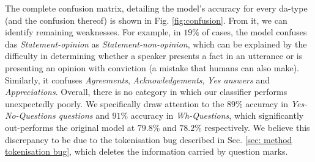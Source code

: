     The complete confusion matrix, detailing the model's accuracy for every \gls{da}-type (and the confusion thereof) is shown in Fig. \ref{fig:confusion}. From it, we can identify remaining weaknesses. For example, in $19\%$ of cases, the model confuses \glspl{da} \textit{Statement-opinion} as \textit{Statement-non-opinion}, which can be explained by the difficulty in determining whether a speaker presents a fact in an utterance or is presenting an opinion with conviction (a mistake that humans can also make). Similarly, it confuses \textit{Agreements}, \textit{Acknowledgements}, \textit{Yes answers} and \textit{Appreciations}. Overall, there is no category in which our classifier performs unexpectedly poorly. We specifically draw attention to the $89 \%$ accuracy in \textit{Yes-No-Questions questions} and $91\%$ accuracy in \textit{Wh-Questions}, which significantly out-performs the original model at $79.8\%$ and $78.2\%$ respectively\cite{kumar2017dialogue}. We believe this discrepancy to be due to the tokenisation bug described in Sec. \ref{sec: method tokenisation bug}, which deletes the information carried by question marks. \newline
